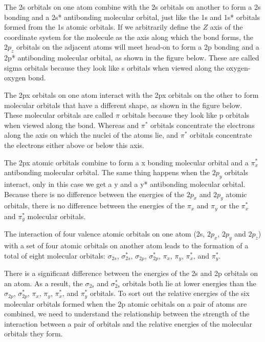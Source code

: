 \documentclass[11pt, oneside]{article}   	%
\begin{document}
The 2s orbitals on one atom combine with the 2s orbitals on another to form a 2s bonding and a 2s* antibonding molecular orbital, just like the 1s and 1s* orbitals formed from the 1s atomic orbitals. 
If we arbitrarily define the $Z$ axis of the coordinate system for the  molecule as the axis along which the bond forms, the $2p_z$ orbitals on the adjacent atoms will meet head-on to form a 2p bonding and a 2p* antibonding molecular orbital, as shown in the figure below. These are called sigma orbitals because they look like s orbitals when viewed along the oxygen-oxygen bond.

The 2px orbitals on one atom interact with the 2px orbitals on the other to form molecular orbitals that have a different shape, as shown in the figure below. 
These molecular orbitals are called $\pi$ orbitals because they look like p orbitals when viewed along the bond. 
Whereas  and $\pi^*$ orbitals concentrate the electrons along the axis on which the nuclei of the atoms lie,  and $\pi^*$ orbitals concentrate the electrons either above or below this axis.

The 2px atomic orbitals combine to form a x bonding molecular orbital and a $\pi_x^*$ antibonding molecular orbital. 
The same thing happens when the $2p_y$ orbitals interact, only in this case we get a y and a y* antibonding molecular orbital. Because there is no difference between the energies of the $2p_x$ and $2p_y$ atomic orbitals, there is no difference between the energies of the $\pi_x$ and $\pi_y$ or the $\pi^*_x$ and $\pi^*_y$ molecular orbitals.

The interaction of four valence atomic orbitals on one atom (2s, $2p_x$, $2p_y$ and $2p_z$) with a set of four atomic orbitals on another atom leads to the formation of a total of eight molecular orbitals: 
$\sigma_{2s}$, $\sigma^*_{2s}$, $\sigma_{2p}$, $\sigma^*_{2p}$, $\pi_x$, $\pi_y$, $\pi^*_{x}$, and  $\pi^*_{y}$.

There is a significant difference between the energies of the 2s and 2p orbitals on an atom. 
As a result, the $\sigma_{2s}$ and $\sigma^*_{2s}$ orbitals both lie at lower energies than the $\sigma_{2p}$, $\sigma^*_{2p}$, $\pi_x$, $\pi_y$, $\pi^*_{x}$, and  $\pi^*_{y}$ orbitals. 
To sort out the relative energies of the six molecular orbitals formed when the 2p atomic orbitals on a pair of atoms are combined, we need to understand the relationship between the strength of the interaction between a pair of orbitals and the relative energies of the molecular orbitals they form.
\end{document}
